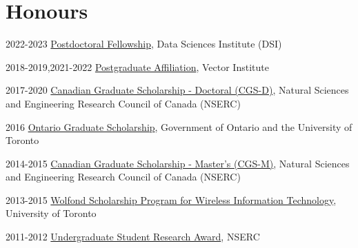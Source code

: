 \documentclass{article}
\begin{document}
\section{Honours}
\begin{CV}
  
  \item[2022-2023] \href{https://datasciences.utoronto.ca/postdoctoral-fellows/}
    {Postdoctoral Fellowship}, Data Sciences Institute (DSI)

  \item[2018-2019,2021-2022] \href{https://vectorinstitute.ai/2021/03/31/vector-welcomes-new-researchers-to-postgraduate-affiliate-program/}
    {Postgraduate Affiliation}, Vector Institute

  \item[2017-2020] \href{http://www.nserc-crsng.gc.ca/Students-Etudiants/PG-CS/BellandPostgrad-BelletSuperieures_eng.asp}
    {Canadian Graduate Scholarship - Doctoral (CGS-D)}, Natural Sciences and
    Engineering Research Council of Canada (NSERC)

  \item[2016] \href{https://osap.gov.on.ca/OSAPPortal/en/A-ZListofAid/PRDR013089.html}
    {Ontario Graduate Scholarship}, Government of Ontario and the University of
    Toronto

  \item[2014-2015] \href{http://www.nserc-crsng.gc.ca/Students-Etudiants/PG-CS/CGSM-BESCM_eng.asp}
    {Canadian Graduate Scholarship - Master's (CGS-M)}, Natural Sciences and
    Engineering Research Council of Canada (NSERC)

  \item[2013-2015] \href{http://www.artsci.utoronto.ca/graduate/scholarships-awards/scholarships-by-department/computer-science}
    {Wolfond Scholarship Program for Wireless Information Technology},
    University of Toronto

  \item[2011-2012] \href{http://www.nserc-crsng.gc.ca/Students-Etudiants/UG-PC/USRA-BRPC_eng.asp}
    {Undergraduate Student Research Award}, NSERC

\end{CV}
\end{document}
